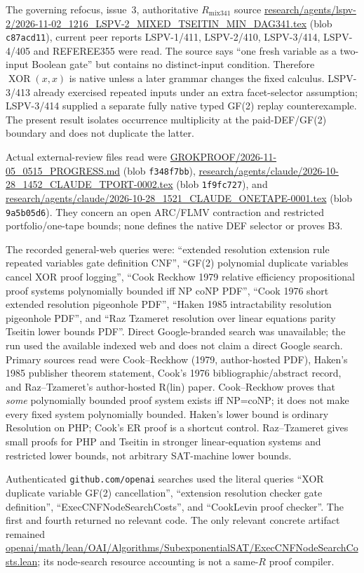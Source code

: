 \documentclass[11pt]{article}
\begin{document}
The governing refocus, issue~3, authoritative $R_{\mathrm{mix341}}$ source
\url{research/agents/lspv-2/2026-11-02_1216_LSPV-2_MIXED_TSEITIN_MIN_DAG341.tex}
(blob \texttt{c87acd11}), current peer reports LSPV-1/411, LSPV-2/410, LSPV-3/414, LSPV-4/405 and REFEREE355 were read.  The source says ``one fresh variable as a two-input Boolean gate'' but contains no distinct-input condition.  Therefore $\operatorname{XOR}(x,x)$ is native unless a later grammar changes the fixed calculus.  LSPV-3/413 already exercised repeated inputs under an extra facet-selector assumption; LSPV-3/414 supplied a separate fully native typed GF(2) replay counterexample.  The present result isolates occurrence multiplicity at the paid-DEF/GF(2) boundary and does not duplicate the latter.

Actual external-review files read were
\url{GROKPROOF/2026-11-05_0515_PROGRESS.md} (blob \texttt{f348f7bb}),
\url{research/agents/claude/2026-10-28_1452_CLAUDE_TPORT-0002.tex} (blob \texttt{1f9fc727}), and
\url{research/agents/claude/2026-10-28_1521_CLAUDE_ONETAPE-0001.tex} (blob \texttt{9a5b05d6}).
They concern an open ARC/FLMV contraction and restricted portfolio/one-tape bounds; none defines the native DEF selector or proves B3.

The recorded general-web queries were: ``extended resolution extension rule repeated variables gate definition CNF'', ``GF(2) polynomial duplicate variables cancel XOR proof logging'', ``Cook Reckhow 1979 relative efficiency propositional proof systems polynomially bounded iff NP coNP PDF'', ``Cook 1976 short extended resolution pigeonhole PDF'', ``Haken 1985 intractability resolution pigeonhole PDF'', and ``Raz Tzameret resolution over linear equations parity Tseitin lower bounds PDF''.  Direct Google-branded search was unavailable; the run used the available indexed web and does not claim a direct Google search.  Primary sources read were Cook--Reckhow (1979, author-hosted PDF), Haken's 1985 publisher theorem statement, Cook's 1976 bibliographic/abstract record, and Raz--Tzameret's author-hosted R(lin) paper.  Cook--Reckhow proves that \emph{some} polynomially bounded proof system exists iff NP=coNP; it does not make every fixed system polynomially bounded.  Haken's lower bound is ordinary Resolution on PHP; Cook's ER proof is a shortcut control.  Raz--Tzameret gives small proofs for PHP and Tseitin in stronger linear-equation systems and restricted lower bounds, not arbitrary SAT-machine lower bounds.

Authenticated \texttt{github.com/openai} searches used the literal queries ``XOR duplicate variable GF(2) cancellation'', ``extension resolution checker gate definition'', ``ExecCNFNodeSearchCosts'', and ``CookLevin proof checker''.  The first and fourth returned no relevant code.  The only relevant concrete artifact remained
\url{openai/math/lean/OAI/Algorithms/SubexponentialSAT/ExecCNFNodeSearchCosts.lean}; its node-search resource accounting is not a same-$R$ proof compiler.
\end{document}
